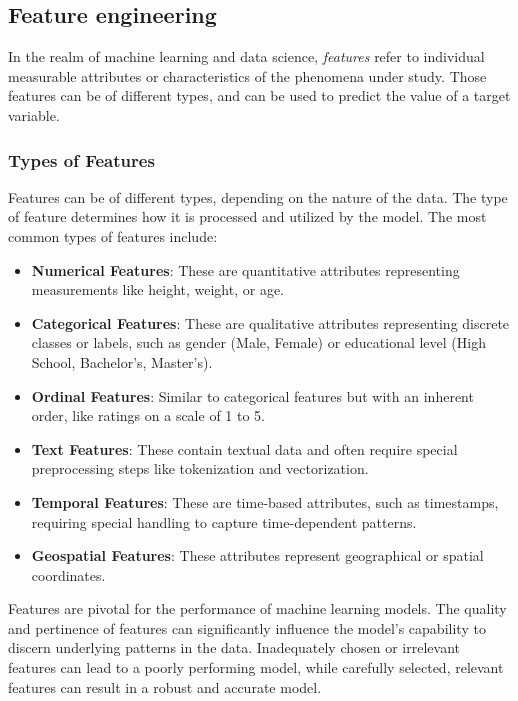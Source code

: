    \subsection{Feature engineering}
    In the realm of machine learning and data science, \textit{features} refer to individual measurable attributes or characteristics of the phenomena under study. Those features can be of different types, and can be used to predict the value of a target variable. 
    
    \subsubsection{Types of Features}
    Features can be of different types, depending on the nature of the data. The type of feature determines how it is processed and utilized by the model. The most common types of features include:

    \begin{itemize}
        \item \textbf{Numerical Features}: These are quantitative attributes representing measurements like height, weight, or age.
        \item \textbf{Categorical Features}: These are qualitative attributes representing discrete classes or labels, such as gender (Male, Female) or educational level (High School, Bachelor's, Master's).
        \item \textbf{Ordinal Features}: Similar to categorical features but with an inherent order, like ratings on a scale of 1 to 5.
        \item \textbf{Text Features}: These contain textual data and often require special preprocessing steps like tokenization and vectorization.
        \item \textbf{Temporal Features}: These are time-based attributes, such as timestamps, requiring special handling to capture time-dependent patterns.
        \item \textbf{Geospatial Features}: These attributes represent geographical or spatial coordinates.
    \end{itemize}

    Features are pivotal for the performance of machine learning models. The quality and pertinence of features can significantly influence the model's capability to discern underlying patterns in the data. Inadequately chosen or irrelevant features can lead to a poorly performing model, while carefully selected, relevant features can result in a robust and accurate model.

